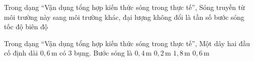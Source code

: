 \begin{ex}
Trong dạng “Vận dụng tổng hợp kiến thức sóng trong thực tế”, Sóng truyền từ môi trường này sang môi trường khác, đại lượng không đổi là
\choice
{\True tần số}
{bước sóng}
{tốc độ}
{biên độ}
\end{ex}

\begin{ex}
Trong dạng “Vận dụng tổng hợp kiến thức sóng trong thực tế”, Một dây hai đầu cố định dài $0,6\,\text{m}$ có 3 bụng. Bước sóng là
\choice
{\True $0,4\,\text{m}$}
{$0,2\,\text{m}$}
{$1,8\,\text{m}$}
{$0,6\,\text{m}$}
\end{ex}
